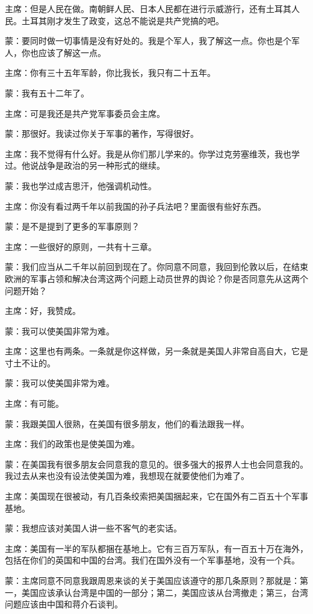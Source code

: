 主席：但是人民在做。南朝鲜人民、日本人民都在进行示威游行，还有土耳其人民。土耳其刚才发生了政变，这总不能说是共产党搞的吧。

蒙：要同时做一切事情是没有好处的。我是个军人，我了解这一点。你也是个军人，你也应该了解这一点。

主席：你有三十五年军龄，你比我长，我只有二十五年。

蒙：我有五十二年了。

主席：可是我还是共产党军事委员会主席。

蒙：那很好。我读过你关于军事的著作，写得很好。

主席：我不觉得有什么好。我是从你们那儿学来的。你学过克劳塞维茨，我也学过。他说战争是政治的另一种形式的继续。

蒙：我也学过成吉思汗，他强调机动性。

主席：你没有看过两千年以前我国的孙子兵法吧？里面很有些好东西。

蒙：是不是提到了更多的军事原则？

主席：一些很好的原则，一共有十三章。

蒙：我们应当从二千年以前回到现在了。你同意不同意，我回到伦敦以后，在结束欧洲的军事占领和解决台湾这两个问题上动员世界的舆论？你是否同意先从这两个问题开始？

主席：好，我赞成。

蒙：我可以使美国非常为难。

主席：这里也有两条。一条就是你这样做，另一条就是美国人非常自高自大，它是寸土不让的。

蒙：我可以使美国非常为难。

主席：有可能。

蒙：我跟美国人很熟，在美国有很多朋友，他们的看法跟我一样。

主席：我们的政策也是使美国为难。

蒙：在美国我有很多朋友会同意我的意见的。很多强大的报界人士也会同意我的。我过去从来也没有设法使美国为难，我想现在就要使他们为难了。

主席：美国现在很被动，有几百条绞索把美国捆起来，它在国外有二百五十个军事基地。

蒙：我想应该对美国人讲一些不客气的老实话。

主席：美国有一半的军队都捆在基地上。它有三百万军队，有一百五十万在海外，包括在你们的英国和中国的台湾。我们在国外没有一个军事基地，没有一个兵。

蒙：主席同意不同意我跟周恩来谈的关于美国应该遵守的那几条原则？那就是：第一，美国应该承认台湾是中国的一部分；第二，美国应该从台湾撤走；第三，台湾问题应该由中国和蒋介石谈判。

